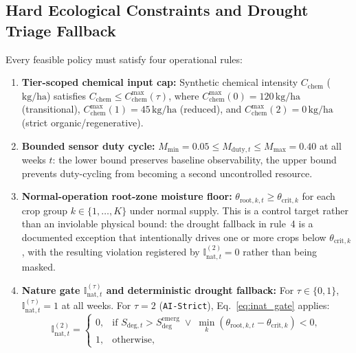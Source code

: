 \documentclass[11pt,a4paper]{article}
\newcommand{\Inatt}{\mathbb{I}_{\mathrm{nat},t}}
\begin{document}
\subsection{Hard Ecological Constraints and Drought Triage Fallback}
Every feasible policy must satisfy four operational rules:
\begin{enumerate}
  \item \textbf{Tier-scoped chemical input cap:} Synthetic chemical intensity $C_{\mathrm{chem}}$ ($\mathrm{kg/ha}$) satisfies $C_{\mathrm{chem}} \le C_{\mathrm{chem}}^{\max}(\tau)$, where $C_{\mathrm{chem}}^{\max}(0) = 120\,\mathrm{kg/ha}$ (transitional), $C_{\mathrm{chem}}^{\max}(1) = 45\,\mathrm{kg/ha}$ (reduced), and $C_{\mathrm{chem}}^{\max}(2) = 0\,\mathrm{kg/ha}$ (strict organic/regenerative).
  \item \textbf{Bounded sensor duty cycle:} $M_{\min}=0.05 \le M_{\mathrm{duty},t} \le M_{\max}=0.40$ at all weeks $t$: the lower bound preserves baseline observability, the upper bound prevents duty-cycling from becoming a second uncontrolled resource.
  \item \textbf{Normal-operation root-zone moisture floor:} $\theta_{\mathrm{root},k,t} \ge \theta_{\mathrm{crit},k}$ for each crop group $k \in \{1,\dots,K\}$ under normal supply. This is a control target rather than an inviolable physical bound: the drought fallback in rule~4 is a documented exception that intentionally drives one or more crops below $\theta_{\mathrm{crit},k}$, with the resulting violation registered by $\Inatt^{(2)}=0$ rather than being masked.
  \item \textbf{Nature gate $\Inatt^{(\tau)}$ and deterministic drought fallback:} For $\tau \in \{0,1\}$, $\Inatt^{(\tau)} = 1$ at all weeks. For $\tau = 2$ (\texttt{AI-Strict}), Eq.~\eqref{eq:inat_gate} applies:
  \begin{equation}
    \Inatt^{(2)} = \begin{cases}
      0, & \text{if } S_{\mathrm{deg},t} > S_{\mathrm{deg}}^{\mathrm{emerg}} \;\lor\; \min_{k}\left(\theta_{\mathrm{root},k,t} - \theta_{\mathrm{crit},k}\right) < 0, \\
      1, & \text{otherwise},
    \end{cases}
    \label{eq:inat_gate}
  \end{equation}

\end{enumerate}
\end{document}
